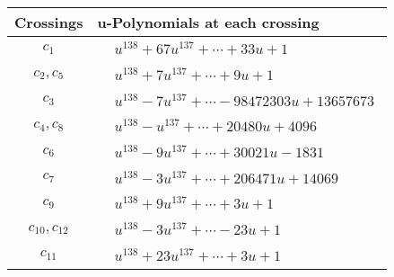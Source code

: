 \documentclass[1p]{elsarticle_modified}
\theoremstyle{definition}
\begin{document}
\begin{tabular}{m{50pt}|m{274pt}}
Crossings & \hspace{64pt}u-Polynomials at each crossing \\
\hline $$\begin{aligned}c_{1}\end{aligned}$$&$\begin{aligned}
&u^{138}+67 u^{137}+\cdots+33 u+1
\end{aligned}$\\
\hline $$\begin{aligned}c_{2},c_{5}\end{aligned}$$&$\begin{aligned}
&u^{138}+7 u^{137}+\cdots+9 u+1
\end{aligned}$\\
\hline $$\begin{aligned}c_{3}\end{aligned}$$&$\begin{aligned}
&u^{138}-7 u^{137}+\cdots-98472303 u+13657673
\end{aligned}$\\
\hline $$\begin{aligned}c_{4},c_{8}\end{aligned}$$&$\begin{aligned}
&u^{138}- u^{137}+\cdots+20480 u+4096
\end{aligned}$\\
\hline $$\begin{aligned}c_{6}\end{aligned}$$&$\begin{aligned}
&u^{138}-9 u^{137}+\cdots+30021 u-1831
\end{aligned}$\\
\hline $$\begin{aligned}c_{7}\end{aligned}$$&$\begin{aligned}
&u^{138}-3 u^{137}+\cdots+206471 u+14069
\end{aligned}$\\
\hline $$\begin{aligned}c_{9}\end{aligned}$$&$\begin{aligned}
&u^{138}+9 u^{137}+\cdots+3 u+1
\end{aligned}$\\
\hline $$\begin{aligned}c_{10},c_{12}\end{aligned}$$&$\begin{aligned}
&u^{138}-3 u^{137}+\cdots-23 u+1
\end{aligned}$\\
\hline $$\begin{aligned}c_{11}\end{aligned}$$&$\begin{aligned}
&u^{138}+23 u^{137}+\cdots+3 u+1
\end{aligned}$\\
\hline
\end{tabular}\\~\\
\end{document}
